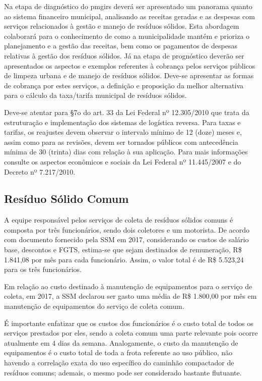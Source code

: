 Na etapa de diagnóstico do \gls{pmgirs} deverá ser apresentado um panorama quanto ao sistema financeiro municipal, analisando as receitas geradas e as despesas com serviços relacionados à gestão e manejo de resíduos sólidos. Esta abordagem colaborará para o conhecimento de como a municipalidade mantém e prioriza o planejamento e a gestão das receitas, bem como os pagamentos de despesas relativas à gestão dos resíduos sólidos.
Já na etapa de prognóstico deverão ser apresentados os aspectos e exemplos referentes à cobrança pelos serviços públicos de limpeza urbana e de manejo de resíduos sólidos. Deve-se apresentar as formas de cobrança por estes serviços, a definição e proposição da melhor alternativa para o cálculo da taxa/tarifa municipal de resíduos sólidos.

Deve-se atentar para §7o do art. 33 da Lei Federal nº 12.305/2010 que trata da estruturação e implementação dos sistemas de logística reversa.
Para taxas e tarifas, os reajustes devem observar o intervalo mínimo de 12 (doze) meses e, assim como para as revisões, devem ser tornados públicos com antecedência mínima de 30 (trinta) dias com relação à sua aplicação.
Para mais informações consulte os aspectos econômicos e sociais da Lei Federal nº 11.445/2007 e do Decreto nº 7.217/2010.

\subsection{Resíduo Sólido Comum}
A equipe responsável pelos serviços de coleta de resíduos sólidos comuns é composta por três funcionários, sendo dois coletores e um motorista. De acordo com documento fornecido pela SSM em 2017, considerando os custos de salário base, descontos e FGTS, estima-se que sejam destinados de remuneração, R\$ 1.841,08 por mês para cada funcionário. Assim, o valor total é de R\$ 5.523,24 para os três funcionários.

Em relação ao custo destinado à manutenção de equipamentos para o serviço de coleta, em 2017, a SSM declarou ser gasto uma média de R\$ 1.800,00 por mês em manutenção de equipamentos do serviço de coleta comum.

É importante enfatizar que os custos dos funcionários é o custo total de todos os serviços prestados por eles, sendo a coleta comum uma parte relevante pois ocorre atualmente em 4 dias da semana. Analogamente, o custo da manutenção de equipamentos é o custo total de toda a frota referente ao uso público, não havendo a correlação exata do uso específico do caminhão compactador de resíduos comuns; ademais, o mesmo pode ser considerado bastante flutuante.

